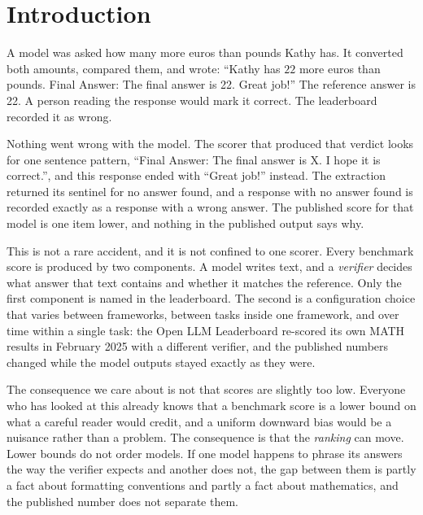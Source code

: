 
\section{Introduction}
\label{sec:intro}

A model was asked how many more euros than pounds Kathy has. It converted both amounts,
compared them, and wrote: ``Kathy has $\boxed{22}$ more euros than pounds. Final Answer: The
final answer is 22. Great job!'' The reference answer is 22. A person reading the response
would mark it correct. The leaderboard recorded it as wrong.

Nothing went wrong with the model. The scorer that produced that verdict looks for one
sentence pattern, ``Final Answer: The final answer is X. I hope it is correct.'', and this
response ended with ``Great job!'' instead. The extraction returned its sentinel for no
answer found, and a response with no answer found is recorded exactly as a response with a
wrong answer. The published score for that model is one item lower, and nothing in the
published output says why.

This is not a rare accident, and it is not confined to one scorer. Every benchmark score is
produced by two components. A model writes text, and a \emph{verifier} decides what answer
that text contains and whether it matches the reference. Only the first component is named in
the leaderboard. The second is a configuration choice that varies between frameworks, between
tasks inside one framework, and over time within a single task: the Open LLM Leaderboard
re-scored its own MATH results in February 2025 with a different verifier, and the published
numbers changed while the model outputs stayed exactly as they were.

The consequence we care about is not that scores are slightly too low. Everyone who has
looked at this already knows that a benchmark score is a lower bound on what a careful reader
would credit, and a uniform downward bias would be a nuisance rather than a problem. The
consequence is that the \emph{ranking} can move. Lower bounds do not order models. If one
model happens to phrase its answers the way the verifier expects and another does not, the
gap between them is partly a fact about formatting conventions and partly a fact about
mathematics, and the published number does not separate them.

